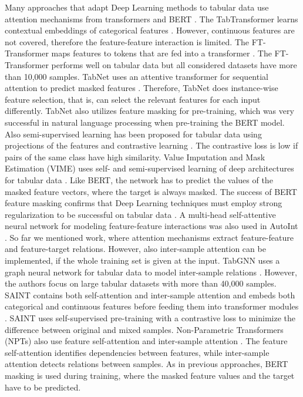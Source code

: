 \documentclass{article}
\theoremstyle{plain}
\theoremstyle{definition}
\theoremstyle{remark}
\begin{document}
Many approaches that adapt Deep Learning methods to tabular data
use attention mechanisms from transformers \citep{Vaswani:17} and BERT \citep{Devlin:19}.
The TabTransformer learns contextual embeddings of categorical
features \citep{Huang:20}.
However, continuous features are not covered, therefore the feature-feature
interaction is limited.
The FT-Transformer maps
features to tokens that are fed into a transformer \citep{Gorishniy:21}.
The FT-Transformer performs well on tabular data but
all considered datasets have more than 10,000 samples.
TabNet uses an attentive transformer for sequential
attention to predict masked features \citep{Arik:21}.
Therefore, TabNet does instance-wise feature selection, that is,
can select the relevant features for each input differently.
TabNet also utilizes feature masking for pre-training, which was very successful
in natural language processing when pre-training the BERT model.
Also semi-supervised learning has been proposed for tabular
data using projections of the
features and contrastive learning \citep{Darabi:21}.
The contrastive loss is low if pairs of the same class have
high similarity.
Value Imputation and Mask Estimation (VIME) uses 
self- and semi-supervised learning of deep architectures for tabular
data \citep{Yoon:20}.
Like BERT, the network has 
to predict the values of the masked feature vectors, where the
target is always masked.
The success of BERT feature masking confirms that Deep Learning techniques
must employ strong regularization to be
successful on tabular data \citep{Kadra:21}.
A multi-head self-attentive neural network for modeling feature-feature interactions
was also used in AutoInt \citep{Song:19}.
So far we mentioned work, where attention mechanisms extract
feature-feature and feature-target relations. 
However, also inter-sample attention can be implemented, if the whole training
set is given at the input.
TabGNN uses a graph neural network for tabular data
to model inter-sample relations \citep{Guo:21}.
However, the authors focus on large tabular datasets with more than
40,000 samples.
SAINT contains both self-attention and inter-sample attention 
and embeds both categorical and continuous features
before feeding them into transformer modules \citep{Somepalli:21}.
SAINT uses self-supervised pre-training with a contrastive loss to
minimize the difference between original and mixed samples.
Non-Parametric Transformers (NPTs) also use feature self-attention 
and inter-sample attention \citep{Kossen:21}.
The feature self-attention identifies dependencies between
features, while inter-sample attention detects relations
between samples. 
As in previous approaches, BERT masking is used
during training, where
the masked feature values and the target have to be predicted.
\end{document}
